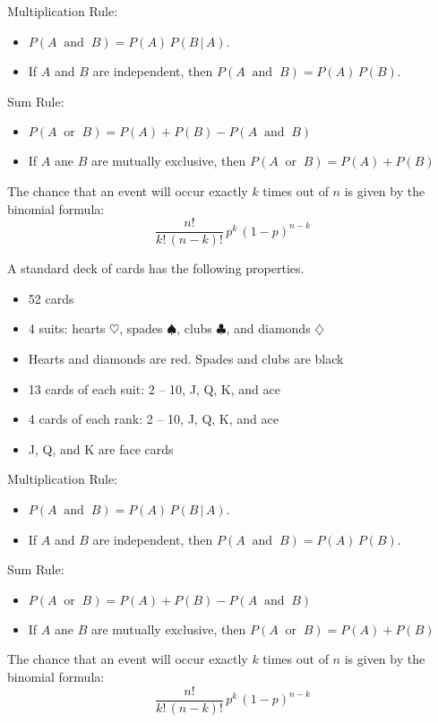 \documentclass[10pt]{article}
\begin{document}
\pagestyle{empty}

Multiplication Rule:  
\begin{itemize}
\item $P(A\;\;\mbox{and}\;\;B)=P(A)\,P(B\,\vert\,A)$.
\item If $A$ and $B$ are independent, then $P(A\;\;\mbox{and}\;\;B)=P(A)\,P(B)$.
\end{itemize}
Sum Rule:
\begin{itemize}
\item $P(A\;\;\mbox{or}\;\;B)=P(A)+P(B) - P(A\;\;\mbox{and}\;\;B)$
\item If $A$ ane $B$ are mutually exclusive, then $P(A\;\;\mbox{or}\;\;B)=P(A)+P(B)$
\end{itemize}  
\bigskip

The chance that an event will occur exactly $k$ times out of $n$ is given by 
the binomial formula:
\[\frac{n!}{k!\,(n-k)!}\,p^k\,(1-p)^{n-k}\]

A standard deck of cards has the following properties.
\begin{itemize}
\item 52 cards
\item 4 suits:  hearts $\heartsuit$, spades $\spadesuit$, clubs $\clubsuit$,
  and diamonds $\diamondsuit$
\item Hearts and diamonds are red.  Spades and clubs are black
\item 13 cards of each suit:  2 -- 10, J, Q, K, and ace
\item 4 cards of each rank:  2 -- 10, J, Q, K, and ace
\item J, Q, and K are face cards
\end{itemize}

\vfill
Multiplication Rule:  
\begin{itemize}
\item $P(A\;\;\mbox{and}\;\;B)=P(A)\,P(B\,\vert\,A)$.
\item If $A$ and $B$ are independent, then $P(A\;\;\mbox{and}\;\;B)=P(A)\,P(B)$.
\end{itemize}
Sum Rule:
\begin{itemize}
\item $P(A\;\;\mbox{or}\;\;B)=P(A)+P(B) - P(A\;\;\mbox{and}\;\;B)$
\item If $A$ ane $B$ are mutually exclusive, then $P(A\;\;\mbox{or}\;\;B)=P(A)+P(B)$
\end{itemize}  
\bigskip

The chance that an event will occur exactly $k$ times out of $n$ is given by 
the binomial formula:
\[\frac{n!}{k!\,(n-k)!}\,p^k\,(1-p)^{n-k}\]
\end{document}
